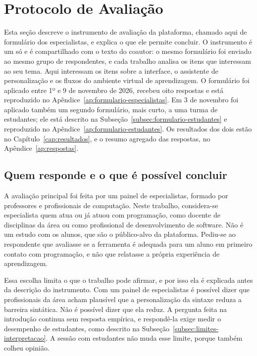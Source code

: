 \section{Protocolo de Avaliação}
\label{sec:protocolo-avaliacao}

Esta seção descreve o instrumento de avaliação da plataforma, chamado aqui de formulário dos especialistas, e explica o que ele permite concluir. O instrumento é um só e é compartilhado com o texto do coautor: o mesmo formulário foi enviado ao mesmo grupo de respondentes, e cada trabalho analisa os itens que interessam ao seu tema. Aqui interessam os itens sobre a interface, o assistente de personalização e os fluxos do ambiente virtual de aprendizagem. O formulário foi aplicado entre 1º e 9 de novembro de 2026, recebeu oito respostas e está reproduzido no Apêndice~\ref{ap:formulario-especialistas}. Em 3 de novembro foi aplicado também um segundo formulário, mais curto, a uma turma de estudantes; ele está descrito na Subseção~\ref{subsec:formulario-estudantes} e reproduzido no Apêndice~\ref{ap:formulario-estudantes}. Os resultados dos dois estão no Capítulo~\ref{cap:resultados}, e o resumo agregado das respostas, no Apêndice~\ref{ap:respostas}.

\subsection{Quem responde e o que é possível concluir}

A avaliação principal foi feita por um painel de especialistas, formado por professores e profissionais de computação. Neste trabalho, considera-se especialista quem atua ou já atuou com programação, como docente de disciplinas da área ou como profissional de desenvolvimento de software. Não é um estudo com os alunos, que são o público-alvo da plataforma. Pediu-se ao respondente que avaliasse se a ferramenta é adequada para um aluno em primeiro contato com programação, e não que relatasse a própria experiência de aprendizagem.

Essa escolha limita o que o trabalho pode afirmar, e por isso ela é explicada antes da descrição do instrumento. Com um painel de especialistas é possível dizer que profissionais da área acham plausível que a personalização da sintaxe reduza a barreira sintática. Não é possível dizer que ela reduz. A pergunta feita na introdução continua sem resposta empírica, e respondê-la exige medir o desempenho de estudantes, como descrito na Subseção~\ref{subsec:limites-interpretacao}. A sessão com estudantes não muda esse limite, porque também colheu opinião.

